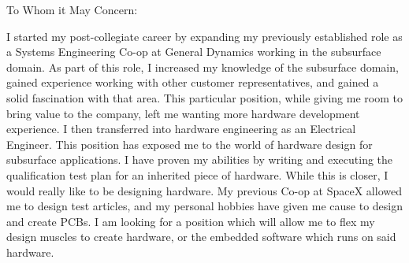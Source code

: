\documentclass[line]{res}
\begin{document}
\setlength\columnsep{-30pt}
\address{56 South St.}
\address{Drury MA, 01343}
\website{}
 
\begin{resume}
 \setlength\multicolsep{2pt}


 
\vspace{1in}
To Whom it May Concern:
 
I started my post-collegiate career by expanding my previously established role
as a Systems Engineering Co-op at General Dynamics working in the subsurface
domain. As part of this role, I increased my knowledge of the subsurface domain,
gained experience working with other customer representatives, and gained a
solid fascination with that area. This particular position, while giving me
room to bring value to the company, left me wanting more hardware development
experience. I then transferred into hardware engineering as an Electrical
Engineer. This position has exposed me to the world of hardware design for
subsurface applications. I have proven my abilities by writing and executing
the qualification test plan for an inherited piece of hardware. While this is
closer, I would really like to be designing hardware. My previous Co-op at
SpaceX allowed me to design test articles, and my personal hobbies have given
me cause to design and create PCBs. I am looking for a position which will
allow me to flex my design muscles to create hardware, or the embedded software
which runs on said hardware. 
 

\end{resume}
\end{document}
